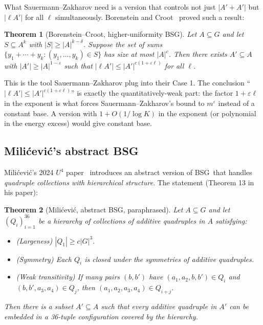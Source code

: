 \documentclass[11pt,a4paper]{article}
\theoremstyle{plain}
\newtheorem{theorem}{Theorem}[section]
\theoremstyle{definition}
\theoremstyle{remark}
\newcommand{\BSG}{\textsf{BSG}}
\begin{document}
What Sauermann--Zakharov need is a version that controls not just $|A' + A'|$ but $|\ell A'|$ for all $\ell$ simultaneously. Borenstein and Croot~\cite{borensteincroot2011} proved such a result:

\begin{theorem}[Borenstein--Croot, higher-uniformity BSG]
Let $A \subseteq G$ and let $S \subseteq A^k$ with $|S| \geq |A|^{k - \delta}$. Suppose the set of sums $\{y_1 + \cdots + y_k : (y_1, \ldots, y_k) \in S\}$ has size at most $|A|^c$. Then there exists $A' \subseteq A$ with $|A'| \geq |A|^{1 - \varepsilon}$ such that $|\ell A'| \leq |A'|^{c(1 + \varepsilon \ell)}$ for all $\ell$.
\end{theorem}

This is the tool Sauermann--Zakharov plug into their Case 1. The conclusion ``$|\ell A'| \leq |A'|^{c(1 + \varepsilon \ell)}$'' is exactly the quantitatively-weak part: the factor $1 + \varepsilon \ell$ in the exponent is what forces Sauermann--Zakharov's bound to $m^\varepsilon$ instead of a constant base. A version with $1 + O(1/\log K)$ in the exponent (or polynomial in the energy excess) would give constant base.

\subsection{Milićević's abstract BSG}

Milićević's 2024 $U^4$ paper~\cite{milicevic2024} introduces an abstract version of \BSG\ that handles \emph{quadruple collections with hierarchical structure}. The statement (Theorem 13 in his paper):

\begin{theorem}[Milićević, abstract BSG, paraphrased]
Let $A \subseteq G$ and let $(Q_i)_{i=1}^{36}$ be a hierarchy of collections of additive quadruples in $A$ satisfying:
\begin{itemize}
\item (Largeness) $|Q_1| \geq c |G|^3$.
\item (Symmetry) Each $Q_i$ is closed under the symmetries of additive quadruples.
\item (Weak transitivity) If many pairs $(b, b')$ have $(a_1, a_2, b, b') \in Q_i$ and $(b, b', a_3, a_4) \in Q_j$, then $(a_1, a_2, a_3, a_4) \in Q_{i+j}$.
\end{itemize}
Then there is a subset $A' \subseteq A$ such that every additive quadruple in $A'$ can be embedded in a 36-tuple configuration covered by the hierarchy.
\end{theorem}
\end{document}
